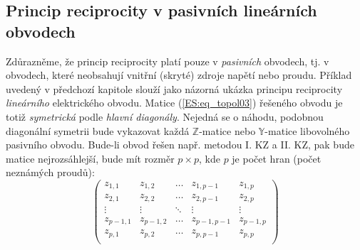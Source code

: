         
      
    \subsection{Princip reciprocity v pasivních lineárních 
    obvodech}\label{teo:IchapIIsecIsubII}
      Zdůrazněme, že princip reciprocity platí pouze v \emph{pasivních} obvodech, tj. v obvodech, 
      které neobsahují vnitřní (skryté) zdroje napětí nebo proudu. Příklad uvedený v předchozí 
      kapitole slouží jako názorná ukázka principu reciprocity \emph{lineárního} elektrického 
      obvodu. Matice (\ref{ES:eq_topol03}) řešeného obvodu je totiž \emph{symetrická} podle 
      \emph{hlavní diagonály}. Nejedná se o náhodu, podobnou diagonální symetrii bude vykazovat 
      každá \(\mathbb{Z}\)-matice nebo \(\mathbb{Y}\)-matice libovolného pasivního obvodu. Bude-li 
      obvod řešen např. metodou I. KZ a II. KZ, pak bude matice nejrozsáhlejší, bude mít rozměr 
      \(p\times p\), kde \(p\) je počet hran (počet neznámých proudů):
      \begin{equation}\label{ES:eq_topol04}
        \left(
          \begin{array}{ccccc}
             z_{1,1}    &  z_{1,2}   & \ldots & z_{1,p-1}   & z_{1,p}   \\
             z_{2,1}    &  z_{2,2}   & \ldots & z_{2,p-1}   & z_{2,p}   \\
             \vdots     &  \vdots    & \ddots & \vdots      &\vdots     \\
             z_{p-1,1}  &  z_{p-1,2} & \ldots & z_{p-1,p-1} & z_{p-1,p} \\
             z_{p,1}    &  z_{p,2}   & \ldots & z_{p,p-1}   & z_{p,p}   \\
          \end{array}
        \right)
     \end{equation}
      
